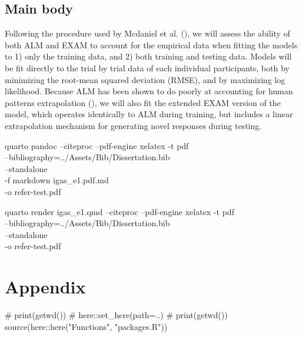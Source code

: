 \documentclass[
  letterpaper,
  DIV=11,
  numbers=noendperiod]{scrartcl}
\newenvironment{Shaded}{\begin{snugshade}}{\end{snugshade}}
\newcommand{\CommentTok}[1]{\textcolor[rgb]{0.37,0.37,0.37}{#1}}
\newcommand{\FunctionTok}[1]{\textcolor[rgb]{0.28,0.35,0.67}{#1}}
\newcommand{\NormalTok}[1]{\textcolor[rgb]{0.00,0.23,0.31}{#1}}
\newcommand{\SpecialCharTok}[1]{\textcolor[rgb]{0.37,0.37,0.37}{#1}}
\newcommand{\StringTok}[1]{\textcolor[rgb]{0.13,0.47,0.30}{#1}}
\begin{document}
\newpage{}

\subsection{Main body}\label{main-body}

Following the procedure used by Mcdaniel et al.
(), we
will assess the ability of both ALM and EXAM to account for the
empirical data when fitting the models to 1) only the training data, and
2) both training and testing data. Models will be fit directly to the
trial by trial data of each individual participants, both by minimizing
the root-mean squared deviation (RMSE), and by maximizing log
likelihood. Because ALM has been shown to do poorly at accounting for
human patterns extrapolation
(), we
will also fit the extended EXAM version of the model, which operates
identically to ALM during training, but includes a linear extrapolation
mechanism for generating novel responses during testing.

quarto pandoc --citeproc --pdf-engine xelatex -t pdf\\
--bibliography=../Assets/Bib/Dissertation.bib\\
--standalone\\
-f markdown igas\_e1.pdf.md\\
-o refer-test.pdf

quarto render igas\_e1.qmd --citeproc --pdf-engine xelatex -t pdf\\
--bibliography=../Assets/Bib/Dissertation.bib\\
--standalone\\
-o refer-test.pdf

\section{Appendix}\label{appendix}

\begin{Shaded}
\begin{Highlighting}[]
\CommentTok{\# print(getwd())}
\CommentTok{\# here::set\_here(path=\textquotesingle{}..\textquotesingle{})}
\CommentTok{\# print(getwd())}
\FunctionTok{source}\NormalTok{(here}\SpecialCharTok{::}\FunctionTok{here}\NormalTok{(}\StringTok{"Functions"}\NormalTok{, }\StringTok{"packages.R"}\NormalTok{))}
\end{Highlighting}
\end{Shaded}
\end{document}
